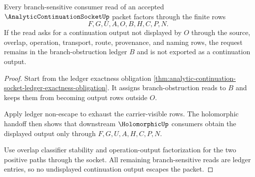 \begin{theorem}
\label{thm:analytic-continuation-socket-ledger-obligation}
Every branch-sensitive consumer read of an accepted $\AnalyticContinuationSocketUp$ packet factors through the finite rows
$$
F,G,U,A,O,B,H,C,P,N.
$$
If the read asks for a continuation output not displayed by $O$ through the source, overlap, operation, transport, route, provenance, and naming rows, the request remains in the branch-obstruction ledger $B$ and is not exported as a continuation output.
\end{theorem}
\begin{proof}
Start from the ledger exactness obligation \autoref{thm:analytic-continuation-socket-ledger-exactness-obligation}. It assigns branch-obstruction reads to $B$ and keeps them from becoming output rows outside $O$.

Apply ledger non-escape to exhaust the carrier-visible rows. The holomorphic handoff then shows that downstream $\HolomorphicUp$ consumers obtain the displayed output only through $F,G,U,A,H,C,P,N$.

Use overlap classifier stability and operation-output factorization for the two positive paths through the socket. All remaining branch-sensitive reads are ledger entries, so no undisplayed continuation output escapes the packet.
\end{proof}


